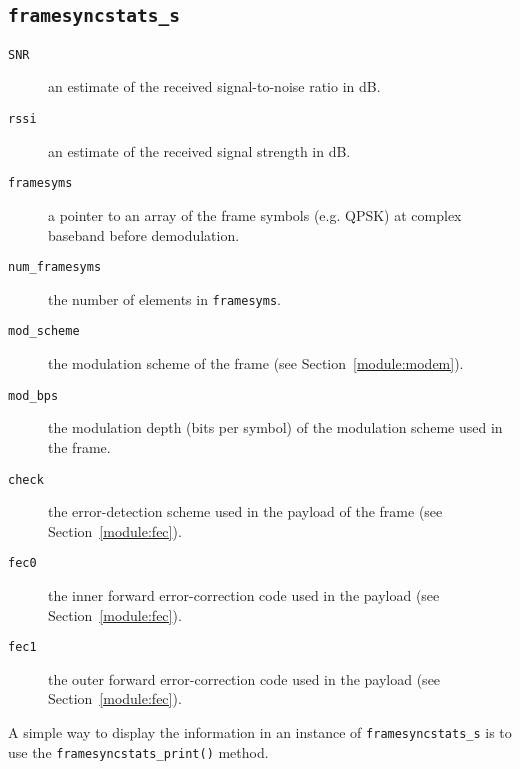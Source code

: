 \subsection{{\tt framesyncstats\_s}}
\label{module:framing:framesyncstats_s}

%
\begin{description}
\item[{\tt SNR}]
    an estimate of the received signal-to-noise ratio in dB.
\item[{\tt rssi}]
    an estimate of the received signal strength in dB.
\item[{\tt framesyms}]
    a pointer to an array of the frame symbols (e.g. QPSK) at complex
    baseband before demodulation.
\item[{\tt num\_framesyms}]
    the number of elements in {\tt framesyms}.
\item[{\tt mod\_scheme}]
    the modulation scheme of the frame (see Section~\ref{module:modem}).
\item[{\tt mod\_bps}]
    the modulation depth (bits per symbol) of the modulation scheme used
    in the frame.
\item[{\tt check}]
    the error-detection scheme used in the payload of the frame
    (see Section~\ref{module:fec}).
\item[{\tt fec0}]
    the inner forward error-correction code used in the payload
    (see Section~\ref{module:fec}).
\item[{\tt fec1}]
    the outer forward error-correction code used in the payload
    (see Section~\ref{module:fec}).
\end{description}
%
A simple way to display the information in an instance of
{\tt framesyncstats\_s} is to use the {\tt framesyncstats\_print()}
method.

